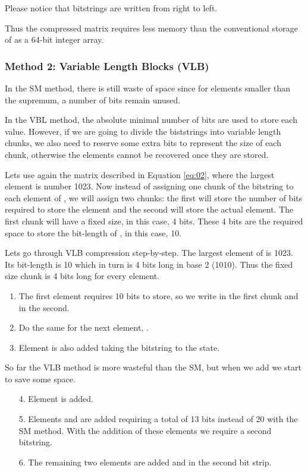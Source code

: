 \documentclass[10pt]{article}
\begin{document}
 Please notice that bitstrings are written from right to left.



Thus the compressed matrix  requires less memory than the conventional storage of  as a 64-bit integer array.

\subsubsection*{Method 2: Variable Length Blocks (VLB)}

In the SM method, there is still waste of space since for elements smaller than the supremum, a number of bits remain unused.

In the VBL method, the absolute minimal number of bits are used to store each value. However, if we are going to divide the biststrings into variable length chunks, we also need to reserve some extra bits to represent the size of each chunk, otherwise the elements cannot be recovered once they are stored.

Lets use again the matrix described in Equation \ref{eq:02}, where  the largest element is number 1023. Now instead of assigning one chunk of the bitstring to each element of , we will assign two chunks: the first will store the number of bits required to store the element and the second  will store the actual element. The first chunk will have a fixed size, in this case, 4 bits. These 4 bits are the required space to store the bit-length of , in this case, 10. 

Lets go through VLB compression step-by-step. The largest element of  is 1023. Its bit-length is 10 which in turn is 4 bits long in base 2 (1010). Thus the fixed size chunk is 4 bits long for every element.

\begin{enumerate}
 \item The first element  requires 10 bits to store, so we write  in the first chunk and  in the second.
 
 \item Do the same for the next element, .
  
 \item Element  is also added taking the bitstring to the state.
 
\end{enumerate}

So far the VLB method is more wasteful than the SM, but when we add   we start to save some space.

\begin{enumerate}
 \item[4.] Element  is added.  
 \item [5.] Elements  and  are added requiring a total of 13 bits instead of 20 with the SM method. With the addition of these elements we require a second bitstring.
 
 \item [6.] The remaining two elements are added  and  in the second bit strip.
 
\end{enumerate}
\end{document}
